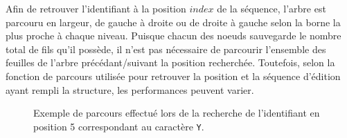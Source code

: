 
%       


Afin de retrouver l'identifiant à la position $index$ de la séquence, l'arbre
est parcouru en largeur, de gauche à droite ou de droite à gauche selon la borne
la plus proche à chaque niveau.  Puisque chacun des noeuds sauvegarde le nombre
total de fils qu'il possède, il n'est pas nécessaire de parcourir l'ensemble des
feuilles de l'arbre précédant/suivant la position recherchée. Toutefois, selon
la fonction de parcours utilisée pour retrouver la position et la séquence
d'édition ayant rempli la structure, les performances peuvent varier.

\begin{figure}
  \centering
  
  \caption[Recherche d'identifiants dans l'arbre] {\label{repl:fig:getexample}
    Exemple de parcours effectué lors de la recherche de l'identifiant en
    position 5 correspondant au caractère \texttt{Y}.}
\end{figure}

